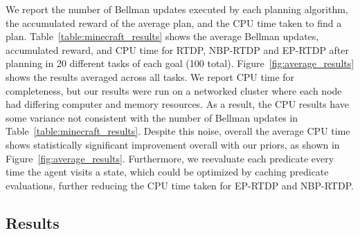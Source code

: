 \documentclass[11pt]{article}
\begin{document}
We report the number of Bellman updates executed by each planning
algorithm, the accumulated reward of the average plan, and the CPU
time taken to find a plan. Table~\ref{table:minecraft_results} shows
the average Bellman updates, accumulated reward, and CPU time for
RTDP, NBP-RTDP and EP-RTDP after planning in 20 different tasks of each
goal (100 total). Figure~\ref{fig:average_results} shows the
results averaged across all tasks.  We report CPU time for
completeness, but our results were run on a networked cluster where
each node had differing computer and memory resources. As a result,
the CPU results have some variance not consistent with the number of
Bellman updates in Table~\ref{table:minecraft_results}.  Despite this
noise, overall the average CPU time shows statistically significant
improvement overall with our priors, as shown in
Figure~\ref{fig:average_results}. Furthermore, we reevaluate each
predicate every time the agent visits a state, which could be optimized by caching predicate evaluations, further
reducing the CPU time taken for EP-RTDP and NBP-RTDP.

\subsection{Results}
\end{document}

